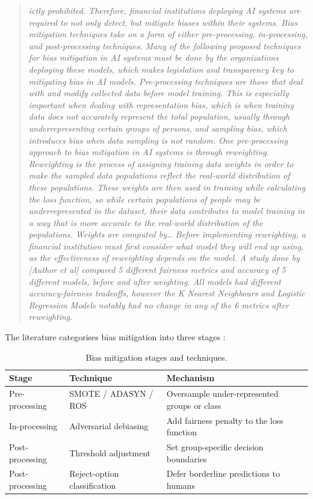 \documentclass[conference]{IEEEtran}
\begin{document}
\begin{quote}
\textit{ictly prohibited. Therefore, financial institutions deploying AI systems are required to not only detect, but mitigate biases within their systems. Bias mitigation techniques take on a form of either pre-processing, in-processing, and post-processing techniques. Many of the following proposed techniques for bias mitigation in AI systems must be done by the organizations deploying these models, which makes legislation and transparency key to mitigating bias in AI models. Pre-processing techniques are those that deal with and modify collected data before model training. This is especially important when dealing with representation bias, which is when training data does not accurately represent the total population, usually through underrepresenting certain groups of persons, and sampling bias, which introduces bias when data sampling is not random. One pre-processing approach to bias mitigation in AI systems is through reweighting. Reweighting is the process of assigning training data weights in order to make the sampled data populations reflect the real-world distribution of these populations. These weights are then used in training while calculating the loss function, so while certain populations of people may be underrepresented in the dataset, their data contributes to model training in a way that is more accurate to the real-world distribution of the populations. Weights are computed by… Before implementing reweighting, a financial institution must first consider what model they will end up using, as the effectiveness of reweighting depends on the model. A study done by [Author et al] compared 5 different fairness metrics and accuracy of 5 different models, before and after weighting. All models had different accuracy-fairness tradeoffs, however the K Nearest Neighbours and Logistic Regression Models notably had no change in any of the 6 metrics after reweighting.}
\end{quote}

The literature categorises bias mitigation into three stages \cite{huang2025,pagano2023}:

\begin{table}[htbp]
\centering
\caption{Bias mitigation stages and techniques.}
\label{tab:mitigation-stages}
\footnotesize
\begin{tabular}{@{}p{2.2cm} p{2.8cm} p{3.2cm}@{}}
\toprule
Stage & Technique & Mechanism \\
\midrule
Pre-processing & SMOTE / ADASYN / ROS & Oversample under-represented groups or class \\
In-processing & Adversarial debiasing & Add fairness penalty to the loss function \\
Post-processing & Threshold adjustment & Set group-specific decision boundaries \\
Post-processing & Reject-option classification & Defer borderline predictions to humans \\
\bottomrule
\end{tabular}
\end{table}
\end{document}
